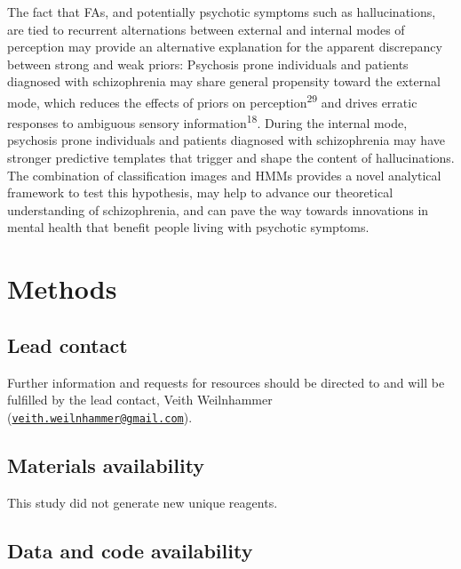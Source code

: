 \documentclass[
]{article}
\begin{document}
The fact that FAs, and potentially psychotic symptoms such as
hallucinations, are tied to recurrent alternations between external and
internal modes of perception may provide an alternative explanation for
the apparent discrepancy between strong and weak priors: Psychosis prone
individuals and patients diagnosed with schizophrenia may share general
propensity toward the external mode, which reduces the effects of priors
on perception\textsuperscript{29} and drives erratic responses to
ambiguous sensory information\textsuperscript{18}. During the internal
mode, psychosis prone individuals and patients diagnosed with
schizophrenia may have stronger predictive templates that trigger and
shape the content of hallucinations. The combination of classification
images and HMMs provides a novel analytical framework to test this
hypothesis, may help to advance our theoretical understanding of
schizophrenia, and can pave the way towards innovations in mental health
that benefit people living with psychotic symptoms.

\newpage

\hypertarget{methods}{%
\section{Methods}\label{methods}}

\hypertarget{lead-contact}{%
\subsection{Lead contact}\label{lead-contact}}

Further information and requests for resources should be directed to and
will be fulfilled by the lead contact, Veith Weilnhammer
(\href{mailto:veith.weilnhammer@gmail.com}{\nolinkurl{veith.weilnhammer@gmail.com}}).

\hypertarget{materials-availability}{%
\subsection{Materials availability}\label{materials-availability}}

This study did not generate new unique reagents.

\hypertarget{data-and-code-availability}{%
\subsection{Data and code
availability}\label{data-and-code-availability}}
\end{document}
